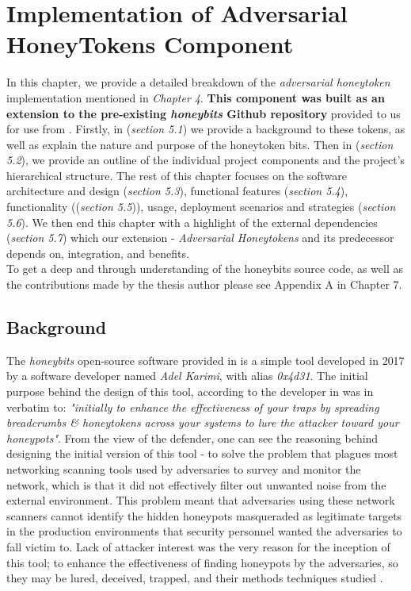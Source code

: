 \documentclass[grad,lot,lof,11pt,oneside,onehalfspace]{RUthesis}
\begin{document}
\chapter{Implementation of Adversarial HoneyTokens Component}
In this chapter, we provide a detailed breakdown of the \textit{adversarial honeytoken} implementation mentioned in \textit{Chapter 4}. \textbf{This component was built as an extension to the pre-existing \textit{honeybits} Github repository} provided to us for use from \cite{ka_honeybits:_2018}. Firstly, in (\textit{section 5.1}) we provide a background to these tokens, as well as explain the nature and purpose of the honeytoken bits. Then in (\textit{section 5.2}), we provide an outline of the individual project components and the project's hierarchical structure. The rest of this chapter focuses on the software architecture and design (\textit{section 5.3}), functional features (\textit{section 5.4}), functionality ((\textit{section 5.5})), usage, deployment scenarios and strategies (\textit{section 5.6}). We then end this chapter with a highlight of the external dependencies (\textit{section 5.7}) which our extension - \textit{Adversarial Honeytokens} and its predecessor depends on, integration, and benefits. \\
 To get a deep and through understanding of the honeybits source code, as well as the contributions made by the thesis author please see Appendix A in Chapter 7. 
\section{Background}
The \textit{honeybits} open-source software provided in \cite{ka_honeybits:_2018} is a simple tool developed in 2017 by a software developer named \textit{Adel Karimi}, with alias \textit{0x4d31}. The initial purpose behind the design of this tool, according to the developer in \cite{ka_honeybits:_2018} was in verbatim to: \textit{"initially to enhance the effectiveness of your traps by spreading breadcrumbs \& honeytokens across your systems to lure the attacker toward your honeypots"}. From the view of the defender, one can see the reasoning behind designing the initial version of this tool - to solve the problem that plagues most networking scanning tools used by adversaries to survey and monitor the network, which is that it did not effectively filter out unwanted noise from the external environment. This problem meant that adversaries using these network scanners cannot identify the hidden honeypots masqueraded as legitimate targets in the production environments that security personnel wanted the adversaries to fall victim to. Lack of attacker interest was the very reason for the inception of this tool; to enhance the effectiveness of finding honeypots by the adversaries, so they may be lured, deceived, trapped, and their methods techniques studied \cite{ka_honeybits:_2018}. 
\end{document}
